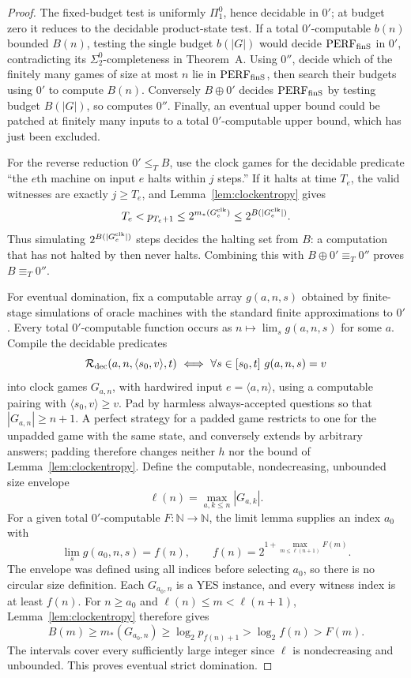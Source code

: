 \begin{proof}
The fixed-budget test is uniformly $\Pi^0_1$, hence decidable in $0'$;
at budget zero it reduces to the decidable product-state test.
If a total $0'$-computable $b(n)$ bounded $B(n)$, testing the single budget
$b(|G|)$ would decide $\mathrm{PERF}_{\mathrm{finS}}$ in $0'$, contradicting its
$\Sigma^0_2$-completeness in Theorem~A.
Using $0''$, decide which of the finitely many games of size at most $n$
lie in $\mathrm{PERF}_{\mathrm{finS}}$, then search their budgets using $0'$ to compute
$B(n)$. Conversely $B\oplus0'$ decides $\mathrm{PERF}_{\mathrm{finS}}$ by testing budget
$B(|G|)$, so computes $0''$. Finally, an eventual upper bound could be
patched at finitely many inputs to a total $0'$-computable upper bound,
which has just been excluded.

For the reverse reduction $0'\le_T B$, use the clock games for the
decidable predicate ``the $e$th machine on input $e$ halts within $j$
steps.'' If it halts at time $T_e$, the valid witnesses are exactly $j\ge T_e$, and Lemma~\ref{lem:clockentropy} gives
\[
 T_e<p_{T_e+1}\le2^{m_*(G^{\rm clk}_e)}\le2^{B(|G^{\rm clk}_e|)}.
\]
Thus simulating $2^{B(|G^{\rm clk}_e|)}$ steps decides the halting set from $B$: a computation that has not halted by then never halts.
Combining this with $B\oplus0'\equiv_T0''$ proves $B\equiv_T0''$.

For eventual domination, fix a computable array $g(a,n,s)$ obtained by
finite-stage simulations of oracle machines with the standard finite
approximations to $0'$. Every total $0'$-computable function occurs as
$n\mapsto\lim_s g(a,n,s)$ for some $a$. Compile the decidable predicates
\[
 \mathcal R_{\rm dec}(a,n,\langle s_0,v\rangle,t)
 \ \Longleftrightarrow\
 \forall s\in[s_0,t]\ g(a,n,s)=v
\]
into clock games $G_{a,n}$, with hardwired input $e=\langle a,n\rangle$, using a computable pairing with
$\langle s_0,v\rangle\ge v$. Pad by harmless always-accepted questions
so that $|G_{a,n}|\ge n+1$. A perfect strategy for a padded game restricts
to one for the unpadded game with the same state, and conversely extends
by arbitrary answers; padding therefore changes neither $h$ nor the
bound of Lemma~\ref{lem:clockentropy}. Define the computable, nondecreasing,
unbounded size envelope
\[
 \ell(n)=\max_{a,k\le n}|G_{a,k}|.
\]
For a given total $0'$-computable $F:\mathbb N\to\mathbb N$, the limit
lemma \cite{Shoenfield} supplies an index $a_0$ with
\[
 \lim_s g(a_0,n,s)=f(n),\qquad
 f(n)=2^{1+\max_{m\le \ell(n+1)}F(m)}.
\]
The envelope was defined using all indices before selecting $a_0$,
so there is no circular size definition. Each $G_{a_0,n}$ is a YES
instance, and every witness index is at least $f(n)$. For $n\ge a_0$
and $\ell(n)\le m<\ell(n+1)$, Lemma~\ref{lem:clockentropy} therefore gives
\[
 B(m)\ge m_*(G_{a_0,n})\ge\log_2p_{f(n)+1}
 >\log_2f(n)>F(m).
\]
The intervals cover every sufficiently large integer since $\ell$ is
nondecreasing and unbounded. This proves eventual strict domination.
\end{proof}

